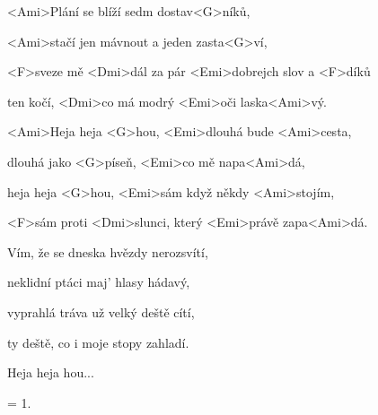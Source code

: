

\zs
<Ami>Plání se blíží sedm dostav<G>níků,

<Ami>stačí jen mávnout a jeden zasta<G>ví,

<F>sveze mě <Dmi>dál za pár <Emi>dobrejch slov a <F>díků

ten kočí, <Dmi>co má modrý <Emi>oči laska<Ami>vý.
\ks

\zr
<Ami>Heja heja <G>hou, <Emi>dlouhá bude <Ami>cesta,

dlouhá jako <G>píseň, <Emi>co mě napa<Ami>dá,

heja heja <G>hou, <Emi>sám když někdy <Ami>stojím,

<F>sám proti <Dmi>slunci, který <Emi>právě zapa<Ami>dá.
\kr

\zs
Vím, že se dneska hvězdy nerozsvítí,

neklidní ptáci maj' hlasy hádavý,

vyprahlá tráva už velký deště cítí,

ty deště, co i moje stopy zahladí.
\ks

\zr
Heja heja hou...
\kr

\zs
= 1.
\ks

\kp
